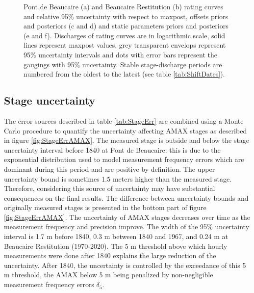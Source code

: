 \documentclass[11pt]{article}
\begin{document}
\begin{figure}[h!]
\begin{subfigure}{0.1\textwidth}
        \end{subfigure}
        \caption{Pont de Beaucaire (a) and Beaucaire Restitution (b) rating curves and relative 95\% uncertainty with respect to maxpost, offsets priors and posteriors (c and d) and static parameters priors and posteriors (e and f). Discharges of rating curves are in logarithmic scale, solid lines represent maxpost values, grey transparent envelops represent 95\% uncertainty intervals and dots with error bars represent the gaugings with 95\% uncertainty. Stable stage-discharge periods are numbered from the oldest to the latest (see table \ref{tab:ShiftDates}).}
        \label{fig:RcsAndParams}
    \end{figure}
    \FloatBarrier
    
    \subsection{Stage uncertainty}
    \label{subsec:StageErrResults}
    
    The error sources described in table \ref{tab:StageErr} are combined using a Monte Carlo procedure to quantify the uncertainty affecting AMAX stages as described in figure \ref{fig:StageErrAMAX}. The measured stage is outside and below the stage uncertainty interval before 1840 at Pont de Beaucaire: this is due to the exponential distribution used to model measurement frequency errors which are dominant during this period and are positive by definition. The upper uncertainty bound is sometimes 1.5 meters higher than the measured stage. Therefore, considering this source of uncertainty may have substantial consequences on the final results. The difference between uncertainty bounds and originally measured stages is presented in the bottom part of figure \ref{fig:StageErrAMAX}. The uncertainty of AMAX stages decreases over time as the measurement frequency and precision improve. The width of the 95\% uncertainty interval is 1.7 m before 1840, 0.3 m between 1840 and 1967, and 0.24 m at Beaucaire Restitution (1970-2020). The 5 m threshold above which hourly measurements were done after 1840 explains the large reduction of the uncertainty. After 1840, the uncertainty is controlled by the exceedance of this 5 m threshold, the AMAX below 5 m being penalized by non-negligible measurement frequency errors $\delta_5$. 
    
\end{document}

